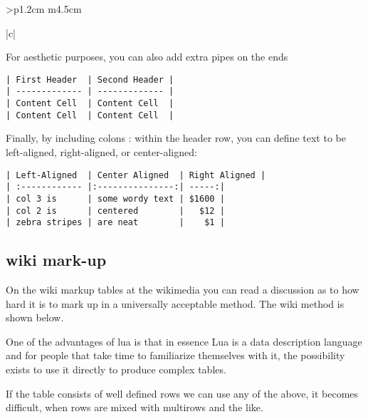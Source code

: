 \begin{tabular}{>{\bfseries}p{1.2cm} m{4.5cm}}
\begin{tabular}[t]{|c|}
\begin{longtable}
For aesthetic purposes, you can also add extra pipes on the ends

\begin{verbatim}
| First Header  | Second Header |
| ------------- | ------------- |
| Content Cell  | Content Cell  |
| Content Cell  | Content Cell  |
\end{verbatim}

Finally, by including colons : within the header row, you can define text to be left-aligned, right-aligned, or center-aligned:

\begin{verbatim}
| Left-Aligned  | Center Aligned  | Right Aligned |
| :------------ |:---------------:| -----:|
| col 3 is      | some wordy text | $1600 |
| col 2 is      | centered        |   $12 |
| zebra stripes | are neat        |    $1 |
\end{verbatim}


\subsection{wiki mark-up}

On the wiki markup tables at the wikimedia you can read a discussion as to how hard it is to mark up in a 
universally acceptable method. The wiki method is shown below.

One of the advantages of lua is that in essence Lua is a data description language and for people that take time
to familiarize themselves with it, the possibility exists to use it directly to produce complex tables.

If the table consists of well defined rows we can use any of the above, it becomes difficult, when rows are mixed with multirows and the like.



\end{longtable}
\end{tabular}
\end{tabular}
